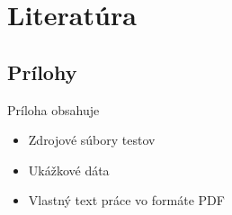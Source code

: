 \documentclass[
  digital, %
  table,   %
oneside,
  nolof,     %
  nolot,     %
]{fithesis3}
\begin{document}
%
%

\chapter*{Literatúra}


  

\begin{appendix}


\chapter{Prílohy}
Príloha obsahuje
\begin{itemize}
	\item Zdrojové súbory testov
	\item Ukážkové dáta 
	\item Vlastný text práce vo formáte PDF
\end{itemize}



\end{appendix}
\end{document}

